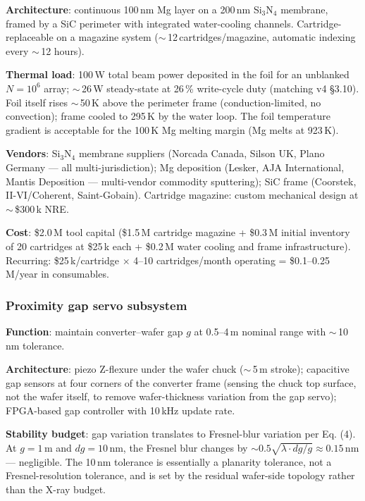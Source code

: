 \documentclass[11pt,letterpaper]{article}
\begin{document}
\textbf{Architecture}: continuous 100\,nm Mg layer on a 200\,nm Si$_3$N$_4$ membrane, framed by a SiC perimeter with integrated water-cooling channels. Cartridge-replaceable on a magazine system ($\sim$\,12\,cartridges/magazine, automatic indexing every $\sim$\,12 hours).

\textbf{Thermal load}: 100\,W total beam power deposited in the foil for an unblanked $N = 10^6$ array; $\sim$\,26\,W steady-state at 26\,\% write-cycle duty (matching v4 \S 3.10). Foil itself rises $\sim$\,50\,K above the perimeter frame (conduction-limited, no convection); frame cooled to 295\,K by the water loop. The foil temperature gradient is acceptable for the 100\,K Mg melting margin (Mg melts at 923\,K).

\textbf{Vendors}: Si$_3$N$_4$ membrane suppliers (Norcada Canada, Silson UK, Plano Germany --- all multi-jurisdiction); Mg deposition (Lesker, AJA International, Mantis Deposition --- multi-vendor commodity sputtering); SiC frame (Coorstek, II-VI/Coherent, Saint-Gobain). Cartridge magazine: custom mechanical design at $\sim$\,\$300\,k NRE.

\textbf{Cost}: \$2.0\,M tool capital (\$1.5\,M cartridge magazine + \$0.3\,M initial inventory of 20 cartridges at \$25\,k each + \$0.2\,M water cooling and frame infrastructure). Recurring: \$25\,k/cartridge $\times$ 4--10 cartridges/month operating = \$0.1--0.25\,M/year in consumables.

\subsubsection{Proximity gap servo subsystem}

\textbf{Function}: maintain converter--wafer gap $g$ at 0.5--4\,\textmu m nominal range with $\sim$\,10\,nm tolerance.

\textbf{Architecture}: piezo Z-flexure under the wafer chuck ($\sim$\,5\,\textmu m stroke); capacitive gap sensors at four corners of the converter frame (sensing the chuck top surface, not the wafer itself, to remove wafer-thickness variation from the gap servo); FPGA-based gap controller with 10\,kHz update rate.

\textbf{Stability budget}: gap variation translates to Fresnel-blur variation per Eq. (4). At $g = 1$\,\textmu m and $dg = 10$\,nm, the Fresnel blur changes by $\sim 0.5 \sqrt{\lambda \cdot dg/g} \approx 0.15$\,nm --- negligible. The 10\,nm tolerance is essentially a planarity tolerance, not a Fresnel-resolution tolerance, and is set by the residual wafer-side topology rather than the X-ray budget.
\end{document}
